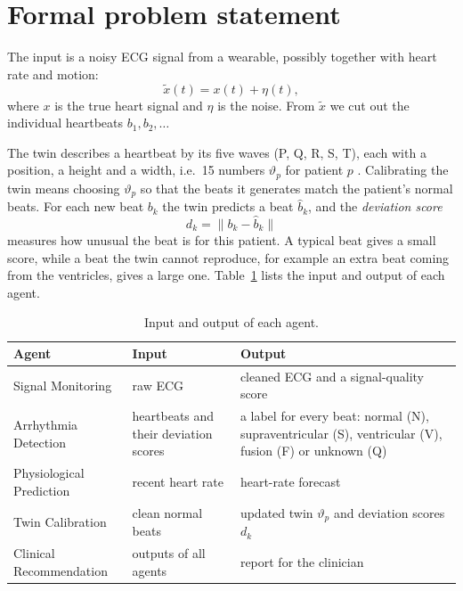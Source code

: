 \section{Formal problem statement}
\label{section:formal}

The input is a noisy ECG signal from a wearable, possibly together with heart rate and motion:
\begin{equation}
\tilde x(t) = x(t) + \eta(t),
\end{equation}
where $x$ is the true heart signal and $\eta$ is the noise. From $\tilde x$ we cut out the individual heartbeats $b_1, b_2, \dots$

The twin describes a heartbeat by its five waves (P, Q, R, S, T), each with a position, a height and a width, i.e.\ 15 numbers $\vartheta_p$ for patient $p$ \cite{mcsharry2003dynamical}. Calibrating the twin means choosing $\vartheta_p$ so that the beats it generates match the patient's normal beats. For each new beat $b_k$ the twin predicts a beat $\hat b_k$, and the \emph{deviation score}
\begin{equation}
d_k = \| b_k - \hat b_k \|
\end{equation}
measures how unusual the beat is for this patient. A typical beat gives a small score, while a beat the twin cannot reproduce, for example an extra beat coming from the ventricles, gives a large one. Table~\ref{tab:subproblems} lists the input and output of each agent.

\begin{table}[H]
\caption{Input and output of each agent.}
\label{tab:subproblems}
\centering
\small
{}
\begin{tabularx}{\textwidth}{@{}>{\raggedright\arraybackslash}p{4.0cm}>{\raggedright\arraybackslash}p{4.4cm}>{\raggedright\arraybackslash}X@{}}
\toprule
\textbf{Agent} & \textbf{Input} & \textbf{Output} \\
\midrule
Signal Monitoring & raw ECG & cleaned ECG and a signal-quality score \\
Arrhythmia Detection & heartbeats and their deviation scores & a label for every beat: normal (N), supraventricular (S), ventricular (V), fusion (F) or unknown (Q) \cite{dechazal2004automatic} \\
Physiological Prediction & recent heart rate & heart-rate forecast \\
Twin Calibration & clean normal beats & updated twin $\vartheta_p$ and deviation scores $d_k$ \\
Clinical Recommendation & outputs of all agents & report for the clinician \\
\bottomrule
\end{tabularx}
\end{table}

